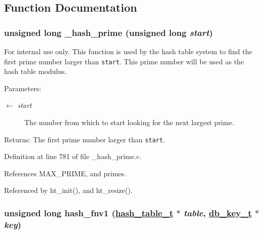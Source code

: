 \subsection{Function Documentation}
\hypertarget{group__dbprim__hash_ga19}{
\subsubsection[\_\-hash\_\-prime]{\setlength{\rightskip}{0pt plus 5cm}unsigned long \_\-hash\_\-prime (unsigned long {\em start})}}
\label{group__dbprim__hash_ga19}


\begin{Desc}
\item[For internal use only.]
This function is used by the hash table system to find the first prime number larger than {\tt start}. This prime number will be used as the hash table modulus.

\begin{Desc}
\item[Parameters:]
\begin{description}
\item[\mbox{$\leftarrow$} {\em start}]The number from which to start looking for the next largest prime.\end{description}
\end{Desc}
\begin{Desc}
\item[Returns:]The first prime number larger than {\tt start}.\end{Desc}
\end{Desc}


Definition at line 781 of file \_\-hash\_\-prime.c.

References MAX\_\-PRIME, and primes.

Referenced by ht\_\-init(), and ht\_\-resize().\hypertarget{group__dbprim__hash_ga7}{
\subsubsection[hash\_\-fnv1]{\setlength{\rightskip}{0pt plus 5cm}unsigned long hash\_\-fnv1 (\hyperlink{struct__hash__table__s}{hash\_\-table\_\-t} $\ast$ {\em table}, \hyperlink{struct__db__key__s}{db\_\-key\_\-t} $\ast$ {\em key})}}
\label{group__dbprim__hash_ga7}


